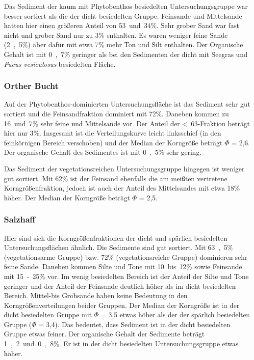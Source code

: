Das Sediment der kaum mit Phytobenthos besiedelten Untersuchungsgruppe war besser sortiert als die der dicht besiedelten Gruppe. Feinsande und Mittelsande hatten hier einen größeren Anteil von \unit{53 und 34}{\%}. Sehr grober Sand war fast nicht und grober Sand nur zu \unit{3}{\%} enthalten. Es waren weniger feine Sande (\unit{2,5}{\%}) aber dafür mit etwa \unit{7}{\%} mehr Ton und Silt enthalten. Der Organische Gehalt ist mit \unit{0,7}{\%} geringer als bei den Sedimenten der dicht mit Seegras und \textit{Fucus vesiculosus} besiedelten Fläche.



\subsubsection{Orther Bucht}

Auf der Phytobenthos-dominierten Untersuchungsfläche ist das Sediment sehr gut sortiert und die Feinsandfraktion dominiert mit \unit{72}{\%}. Daneben kommen zu \unit{16 und 7}{\%} sehr feine und Mittelsande vor. Der Anteil der \unit{<63}{\mu\metre}-Fraktion beträgt hier nur \unit{3}{\%}. Insgesamt ist die Verteilungskurve leicht linksschief (in den feinkörnigen Bereich verschoben) und der Median der Korngröße beträgt $ \Phi $ = 2,6. Der organische Gehalt des Sedimentes ist mit \unit{0,5}{\%} sehr gering.

Das Sediment der vegetationsreichen Untersuchungsgruppe hingegen ist weniger gut sortiert. Mit \unit{62}{\%} ist der Feinsand ebenfalls die am meißten vertretene Korngrößenfraktion, jedoch ist auch der Anteil des Mittelsandes mit etwa \unit{18}{\%} höher. Der Median der Korngröße beträgt $ \Phi $ = 2,5. 

\subsubsection{Salzhaff}

Hier sind sich die Korngrößenfraktionen der dicht und spärlich besiedelten Untersuchungsflächen ähnlich. Die Sedimente sind gut sortiert. Mit \unit{63,5}{\%} (vegetationsarme Gruppe) bzw. \unit{72}{\%} (vegetationsreiche Gruppe) dominieren sehr feine Sande. Daneben kommen Silte und Tone mit \unit{10 bis 12}{\%} sowie Feinsande mit  \unit{15-25}{\%} vor. Im wenig besiedelten Bereich ist der Anteil der Silte und Tone geringer und der Anteil der Feinsande deutlich höher als im dicht besiedelten Bereich. Mittel-bis Grobsande haben keine Bedeutung in den  Korngrößenverteilungen beider Gruppen. Der Median der Korngröße ist in der dicht besiedelten Gruppe mit $ \Phi $ = 3,5 etwas höher als der der spärlich besiedelten Gruppe ($ \Phi $ = 3,4). Das bedeutet, dass Sediment ist in der dicht besiedelten Gruppe etwas feiner. Der organische Gehalt der Sedimente beträgt \unit{1,2 und 0,8}{\%}. Er ist in der dicht besiedelten Untersuchungsgruppe etwas höher. 


